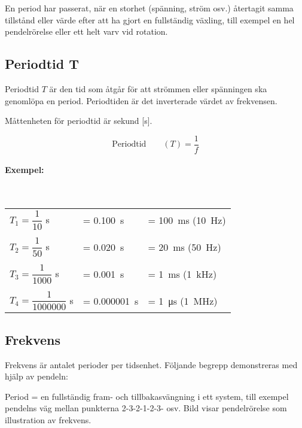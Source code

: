 En period har passerat, när en storhet (spänning, ström osv.) återtagit samma
tillstånd eller värde efter att ha gjort en fullständig växling, till exempel en hel
pendelrörelse eller ett helt varv vid rotation.

\newpage
\subsection{Periodtid T}

Periodtid \(T\) är den tid som åtgår för att strömmen eller spänningen ska
genomlöpa en period. Periodtiden är det inverterade värdet av frekvensen.

Måttenheten för periodtid är sekund [s].

$$\text{Periodtid} \qquad (T) = \dfrac{1}{f}$$

\noindent
\paragraph{Exempel:}~\\[1ex]
\begin{small}
\begin{tabular}{@{}lll}
\(T_1=\dfrac{1}{10}\) s & = \SI{0,100}{\second} & = \SI{100}{\milli\second} (\SI{10}{\hertz})\\
\\
\(T_2=\dfrac{1}{50}\) s & = \SI{0,020}{\second} & = \SI{20}{\milli\second} (\SI{50}{\hertz})\\
\\
\(T_3=\dfrac{1}{1000}\) s & = \SI{0,001}{\second} & = \SI{1}{\milli\second} (\SI{1}{\kilo\hertz})\\
\\
\(T_4=\dfrac{1}{1000000}\) s & = \SI{0,000001}{\second} & = \SI{1}{\micro\second} (\SI{1}{\mega\hertz})\\
\end{tabular}
\end{small}

\subsection{Frekvens}
\label{frekvens}

Frekvens är antalet perioder per tidsenhet.
Följande begrepp demonstreras med hjälp av pendeln:

Period = en fullständig fram- och tillbakasvängning i ett system, till exempel
pendelns väg mellan punkterna 2-3-2-1-2-3- osv. Bild  visar
pendelrörelse som illustration av frekvens.

